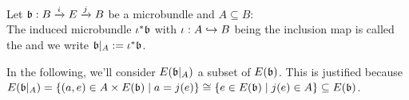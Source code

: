 \\ Let $\bundleb: \bundle{B}{E}{i}{j}$ be a microbundle and $A \subseteq B$:
\\ The induced microbundle $\iota^*\bundleb$ with $\iota: A \incl B$ being the inclusion map is called the  and we write $\bundleb \restrict{A} := \iota^*\bundleb$.

\begin{remark}
In the following, we'll consider $E(\bundleb\restrict{A})$ a subset of $E(\bundleb)$.
This is justified because
$E(\bundleb\restrict{A}) = \{ (a, e) \in A \times E(\bundleb) \mid a = j(e) \} \cong \{ e \in E(\bundleb) \mid j(e) \in A \} \subseteq E(\bundleb)$.
\end{remark}